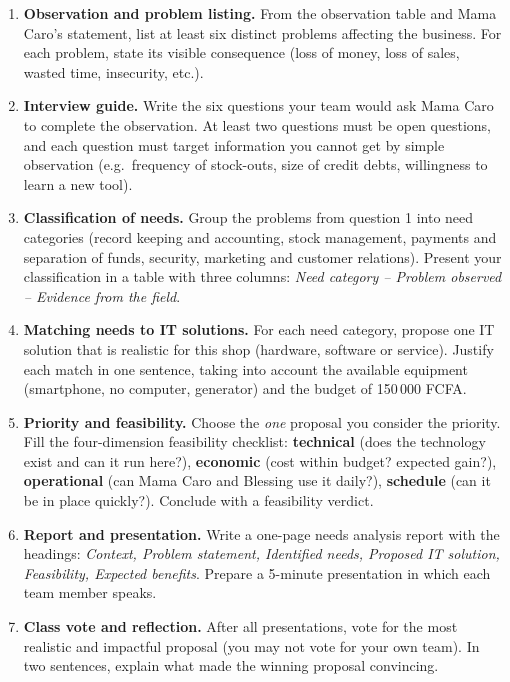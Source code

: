 \documentclass[11pt]{article}
\begin{document}
\begin{enumerate}
\item \textbf{Observation and problem listing.} From the observation table and Mama Caro's statement, list at least six distinct problems affecting the business. For each problem, state its visible consequence (loss of money, loss of sales, wasted time, insecurity, etc.).
\item \textbf{Interview guide.} Write the six questions your team would ask Mama Caro to complete the observation. At least two questions must be open questions, and each question must target information you cannot get by simple observation (e.g.\ frequency of stock-outs, size of credit debts, willingness to learn a new tool).
\item \textbf{Classification of needs.} Group the problems from question 1 into need categories (record keeping and accounting, stock management, payments and separation of funds, security, marketing and customer relations). Present your classification in a table with three columns: \emph{Need category -- Problem observed -- Evidence from the field}.
\item \textbf{Matching needs to IT solutions.} For each need category, propose one IT solution that is realistic for this shop (hardware, software or service). Justify each match in one sentence, taking into account the available equipment (smartphone, no computer, generator) and the budget of 150\,000 FCFA.
\item \textbf{Priority and feasibility.} Choose the \emph{one} proposal you consider the priority. Fill the four-dimension feasibility checklist: \textbf{technical} (does the technology exist and can it run here?), \textbf{economic} (cost within budget? expected gain?), \textbf{operational} (can Mama Caro and Blessing use it daily?), \textbf{schedule} (can it be in place quickly?). Conclude with a feasibility verdict.
\item \textbf{Report and presentation.} Write a one-page needs analysis report with the headings: \emph{Context, Problem statement, Identified needs, Proposed IT solution, Feasibility, Expected benefits}. Prepare a 5-minute presentation in which each team member speaks.
\item \textbf{Class vote and reflection.} After all presentations, vote for the most realistic and impactful proposal (you may not vote for your own team). In two sentences, explain what made the winning proposal convincing.
\end{enumerate}
\end{document}
